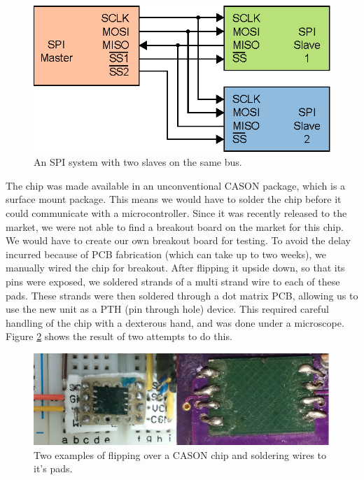 \begin{figure}
\begin{center}
\includegraphics{images/SPI_SLAVES.eps}
\caption{An SPI system with two slaves on the same bus.}
\label{Fig:SPISLAVES}
\end{center}
\end{figure}

The chip was made available in an unconventional CASON package,
which is a surface mount package.
This means we would have to solder the chip before it could communicate with a microcontroller.
Since it was recently released to the market,
we were not able to find a breakout board on the market for this chip.
We would have to create our own breakout board for testing.
To avoid the delay incurred because of PCB fabrication (which can take up to two weeks), we manually wired the chip for breakout.
After flipping it upside down,
so that its pins were exposed,
we soldered strands of a multi strand wire to each of these pads. These strands were then soldered through a dot matrix PCB, allowing us to use the new unit as a PTH (pin through hole) device. This required careful handling of the chip with a dexterous hand, and was done under a microscope. Figure \ref{Fig:CASON} shows the result of two attempts to do this. 

\begin{figure}
\begin{center}
\includegraphics[width=1.0\textwidth]{images/CASON.jpg}
\caption{Two examples of flipping over a CASON chip and soldering wires to it's pads.}
\label{Fig:CASON}
\end{center}
\end{figure}

